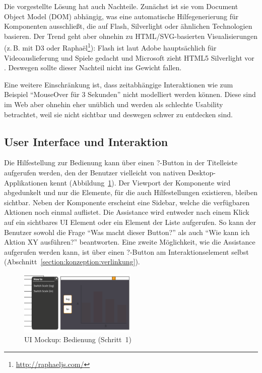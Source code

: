 \documentclass[
	headsepline,
	footsepline,
	fontsize=12pt,
	bibliography=totoc
]{scrbook}
\begin{document}

Die vorgestellte Lösung hat auch Nachteile. Zunächst ist sie vom Document Object Model (DOM) abhängig, was eine automatische Hilfegenerierung für Komponenten ausschließt, die auf Flash, Silverlight oder ähnlichen Technologien basieren. Der Trend geht aber ohnehin zu HTML/SVG-basierten Visualisierungen (z.\,B. mit D3 \cite{Bostock2011} oder Raphaël\footnote{\url{http://raphaeljs.com/}}): Flash ist laut Adobe hauptsächlich für Videoauslieferung und Spiele gedacht \cite{Adobe2013} und Microsoft zieht HTML5 Silverlight vor \cite{Foley2010}. Deswegen sollte dieser Nachteil nicht ins Gewicht fallen.

Eine weitere Einschränkung ist, dass zeitabhängige Interaktionen wie zum Beispiel \enquote{MouseOver für 3 Sekunden} nicht modelliert werden können. Diese sind im Web aber ohnehin eher unüblich und werden als schlechte Usability betrachtet, weil sie nicht sichtbar und deswegen schwer zu entdecken sind.

\subsection{User Interface und Interaktion}
\label{section:konzeption:bedienung:ui}


Die Hilfestellung zur Bedienung kann über einen ?-Button in der Titelleiste aufgerufen werden, den der Benutzer vielleicht von nativen Desktop-Applikationen kennt (Abbildung~\ref{figure:bedienung-step1}). Der Viewport der Komponente wird abgedunkelt und nur die Elemente, für die auch Hilfestellungen existieren, bleiben sichtbar. Neben der Komponente erscheint eine Sidebar, welche die verfügbaren Aktionen noch einmal auflistet. Die Assistance wird entweder nach einem Klick auf ein sichtbares UI Element oder ein Element der Liste aufgerufen. So kann der Benutzer sowohl die Frage \enquote{Was macht dieser Button?} als auch \enquote{Wie kann ich Aktion XY ausführen?} beantworten. Eine zweite Möglichkeit, wie die Assistance aufgerufen werden kann, ist über einen ?-Button am Interaktionselement selbst (Abschnitt~\ref{section:konzeption:verlinkung}).

\begin{figure}[htbp]
   \centering
   \includegraphics[width=0.5\textwidth]{images/konzeption-bedienung-step1.png}
   \caption{UI Mockup: Bedienung (Schritt~1)}
   \label{figure:bedienung-step1}
\end{figure}
\end{document}
